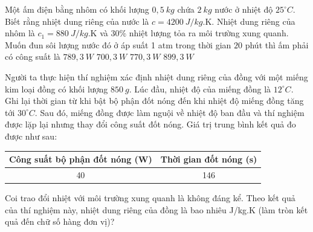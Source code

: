 \begin{ex} 
	Một ấm điện bằng nhôm có khối lượng $0,5 \ kg$ chứa $2 \ kg$ nước ở nhiệt độ $25^\circ C$. Biết rằng nhiệt dung riêng của nước là $c=4200 \ J /kg$.K. Nhiệt dung riêng của nhôm là $c_1=880 \ J /kg$.K và $30\%$ nhiệt lượng tỏa ra môi trường xung quanh. Muốn đun sôi lượng nước đó ở áp suất 1 atm trong thời gian $20$ phút thì ấm phải có công suất là
	\choice
	{\True $789,3 \ W$}
	{$700,3 \ W$}
	{$770,3 \ W$}
	{$899,3 \ W$}
\end{ex}
\begin{ex} 
	Người ta thực hiện thí nghiệm xác định nhiệt dung riêng của đồng với một miếng kim loại đồng có khối lượng $850 \ g$. Lúc đầu, nhiệt độ của miếng đồng là $12^\circ C$. Ghi lại thời gian từ khi bật bộ phận đốt nóng đến khi nhiệt độ miếng đồng tăng tới $30^\circ C$. Sau đó, miếng đồng được làm nguội về nhiệt độ ban đầu và thí nghiệm được lặp lại nhưng thay đổi công suất đốt nóng. Giá trị trung bình kết quả đo được như sau:
	\begin{center}
		\begin{tabular}{|c|c|}
			\hline
			Công suất bộ phận đốt nóng (W) & Thời gian đốt nóng (s) \\
			\hline
			40 & 146 \\
			\hline
		\end{tabular}
	\end{center}
	Coi trao đổi nhiệt với môi trường xung quanh là không đáng kể. Theo kết quả của thí nghiệm này, nhiệt dung riêng của đồng là bao nhiêu J/kg.K (làm tròn kết quả đến chữ số hàng đơn vị)?
\end{ex}
